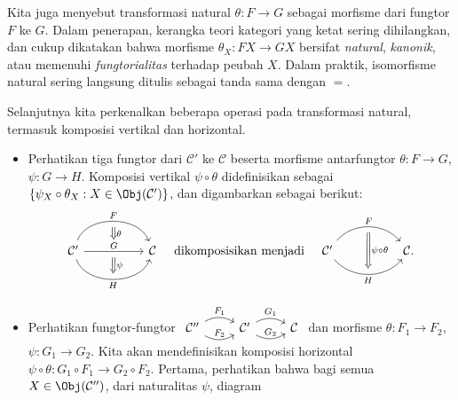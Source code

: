 \begin{convention}\label{con:naturaltrans-morphism}
	Kita juga menyebut transformasi natural $\theta: F \to G$ sebagai morfisme dari fungtor $F$ ke $G$. Dalam penerapan, kerangka teori kategori yang ketat sering dihilangkan, dan cukup dikatakan bahwa morfisme $\theta_X: FX \to GX$ bersifat \emph{natural}, \emph{kanonik}, atau memenuhi \emph{fungtorialitas} terhadap peubah $X$. Dalam praktik, isomorfisme natural sering langsung ditulis sebagai tanda sama dengan $=$.
\end{convention}

Selanjutnya kita perkenalkan beberapa operasi pada transformasi natural, termasuk komposisi vertikal dan horizontal.
\begin{itemize}
	\item Perhatikan tiga fungtor dari $\mathcal{C}'$ ke $\mathcal{C}$ beserta morfisme antarfungtor $\theta: F \to  G$,  $\psi: G \to H$. Komposisi vertikal $\psi \circ \theta$ didefinisikan sebagai $\{ \psi_X \circ \theta_X : X \in \Obj(\mathcal{C}') \}$, dan digambarkan sebagai berikut:
	\[\begin{tikzcd}
		\mathcal{C}'
			\arrow[bend left=70, rr, "F", ""' name=U]
			\arrow[rr, "G" name=MM, ""' name=M]
			\arrow[bend right=70, rr, "" name=D, "H"'] & &
		\arrow[Rightarrow, to path=(U) -- (MM) \tikztonodes, "\theta"] \arrow[Rightarrow, to path=(M) -- (D) \tikztonodes, "\psi"] \mathcal{C} 
	\end{tikzcd} \quad \text{dikomposisikan menjadi} \quad \begin{tikzcd}
		\mathcal{C}'
		\arrow[bend left=50, rr, "F", ""' name=U]
		\arrow[bend right=50, rr, "" name=D, "H"']
		& & \arrow[Rightarrow, to path=(U) -- (D) \tikztonodes, "\psi \circ \theta"] \mathcal{C} .
	\end{tikzcd}\]
	\item Perhatikan fungtor-fungtor
	$\begin{tikzcd}
		\mathcal{C}'' \arrow[bend left=30, r, "F_1"] \arrow[bend right=30, r, "F_2"] & \mathcal{C}' \arrow[bend left=30, r, "G_1"] \arrow[bend right=30, r, "G_2"] & \mathcal{C}
	\end{tikzcd}$
	dan morfisme $\theta: F_1 \to F_2$, $\psi: G_1 \to G_2$. Kita akan mendefinisikan komposisi horizontal $\psi \circ \theta: G_1 \circ F_1 \to G_2 \circ F_2$. Pertama, perhatikan bahwa bagi semua $X \in \Obj(\mathcal{C}'')$, dari naturalitas $\psi$, diagram
	\begin{equation}\label{eqn:horizontal-comp}\begin{tikzcd}

\end{tikzcd}
\end{equation}
\end{itemize}
